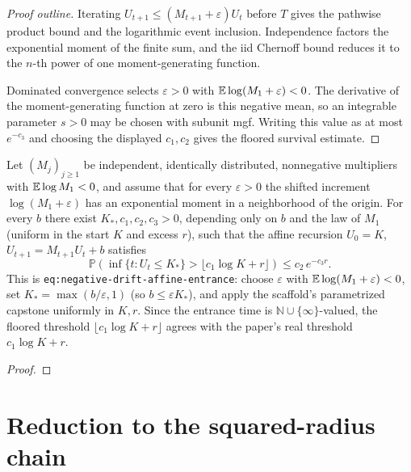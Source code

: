 \begin{proof}[Proof outline]
  \leanok
  Iterating $U_{t+1}\leq(M_{t+1}+\varepsilon)U_t$ before $T$ gives the
  pathwise product bound and the logarithmic event inclusion. Independence
  factors the exponential moment of the finite sum, and the iid Chernoff
  bound reduces it to the $n$-th power of one moment-generating function.

  Dominated convergence selects $\varepsilon>0$ with
  $\mathbb{E}\log(M_1+\varepsilon)<0$. The derivative of the moment-generating
  function at zero is this negative mean, so an integrable parameter $s>0$
  may be chosen with subunit mgf. Writing this value as at most $e^{-c_3}$
  and choosing the displayed $c_1,c_2$ gives the floored survival estimate.
\end{proof}

\begin{lemma}
  \label{lem:negative-drift-affine-entrance}
  \leanok
  Let $(M_j)_{j\ge1}$ be independent, identically distributed, nonnegative multipliers with
  $\mathbb{E}\log M_1<0$, and assume that for every $\varepsilon>0$ the shifted increment
  $\log(M_1+\varepsilon)$ has an exponential moment in a neighborhood of the origin. For every
  $b$ there exist $K_\ast,c_1,c_2,c_3>0$, depending only on $b$ and the law of $M_1$ (uniform in
  the start $K$ and excess $r$), such that the affine recursion $U_0=K$,
  $U_{t+1}=M_{t+1}U_t+b$ satisfies
  \[
    \mathbb P\!\left(\inf\{t:U_t\le K_\ast\} > \lfloor c_1\log K + r\rfloor\right)
    \le c_2\,e^{-c_3 r}.
  \]
  This is \texttt{eq:negative-drift-affine-entrance}: choose $\varepsilon$ with
  $\mathbb{E}\log(M_1+\varepsilon)<0$, set $K_\ast=\max(b/\varepsilon,1)$ (so $b\le\varepsilon K_\ast$),
  and apply the scaffold's parametrized capstone uniformly in $K,r$. Since the entrance time
  is $\mathbb N\cup\{\infty\}$-valued, the floored threshold $\lfloor c_1\log K+r\rfloor$ agrees
  with the paper's real threshold $c_1\log K+r$.
\end{lemma}
\begin{proof}\leanok{}\end{proof}

\section{Reduction to the squared-radius chain}
\label{sec:vector-radius-reduction}

